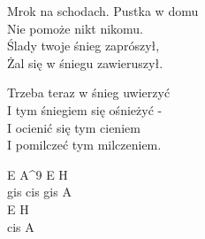 \begin{text}
    Mrok na schodach. Pustka w domu\\
    Nie pomoże nikt nikomu.\\
    Ślady twoje śnieg zaprószył,\\
    Żal się w śniegu zawieruszył.

    Trzeba teraz w śnieg uwierzyć\\
    I tym śniegiem się ośnieżyć -\\
    I ocienić się tym cieniem\\
    I pomilczeć tym milczeniem.
\end{text}
\begin{chord}
    E A^{9} E H\\
    gis cis gis A\\
    E H\\
    cis A
\end{chord}